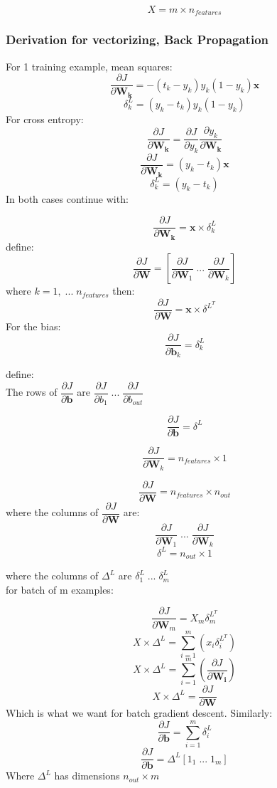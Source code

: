 \documentclass{article}
\begin{document}
$$X = m \times n_{features}$$

\subsubsection*{Derivation for vectorizing, Back Propagation}

For 1 training example, mean squares:
$$\dfrac{\partial{J}}{\partial{\mathbf{W_k}}} = -(t_k - y_k)y_k(1 - y_k)\mathbf{x}$$
$$\delta_k^L = (y_k - t_k)y_k(1 - y_k)$$
For cross entropy:
$$\dfrac{\partial{J}}{\partial{\mathbf{W_k}}} = \dfrac{\partial{J}}{\partial{y_k}} \dfrac{\partial{y_k}}{\partial{\mathbf{W_k}}}$$
$$\dfrac{\partial{J}}{\partial{\mathbf{W_k}}} = (y_k - t_k) \mathbf{x}$$
$$\delta_k^L =  (y_k - t_k)$$
In both cases continue with:

$$\dfrac{\partial{J}}{\partial{\mathbf{W_k}}} = \mathbf{x}\times \delta_k^L$$
define:
$$\dfrac{\partial{J}}{\partial{\mathbf{W}}} = [ \dfrac{\partial{J}}{\partial{\mathbf{W}_1}} \; ... \; \dfrac{\partial{J}}{\partial{\mathbf{W}_k}}]$$
where $k = 1, \; ... \; n_{features}$ then:
$$\dfrac{\partial{J}}{\partial{\mathbf{W}}} = \mathbf{x} \times \delta ^{L^T}$$
For the bias:
$$\dfrac{\partial{J}}{\partial{\mathbf{b}_k}} = \delta _k ^{L}$$

define:\\
The rows of $\dfrac{\partial{J}}{\partial{\mathbf{b}}}$ are $\dfrac{\partial{J}}{\partial{b_1}} \; ... \; \dfrac{\partial{J}}{\partial{b_{out}}}$


$$\dfrac{\partial{J}}{\partial{\mathbf{b}}} = \delta ^L$$

$$\dfrac{\partial{J}}{\partial{\mathbf{W}_k}} = n_{features} \times 1$$

$$\dfrac{\partial{J}}{\partial{\mathbf{W}}} = n_{features} \times n_{out}$$
where the columns of $\dfrac{\partial{J}}{\partial{\mathbf{W}}}$ are:
$$\dfrac{\partial{J}}{\partial{\mathbf{W}_1}} \; ... \; \dfrac{\partial{J}}{\partial{\mathbf{W}_k}}$$
$$\delta^{L} = n_{out} \times 1$$

where the columns of $\Delta ^{L}$ are $\delta_1^{L} \; ... \; \delta_m^{L}$\\
for batch of m examples:

$$\dfrac{\partial{J}}{\partial{\mathbf{W}}_m} = X_m\delta_m^{L^T}$$
$$X\times \Delta ^{L}  = \sum_{i=1}^{m}(x_i \delta_i^{L^T})$$
$$X \times \Delta ^{L}  = \sum_{i=1}^{m}(\dfrac{\partial{J}}{\partial{\mathbf{W_i}}})$$
$$X \times \Delta ^{L}  = \dfrac{\partial{J}}{\partial{\mathbf{W}}}$$
Which is what we want for batch gradient descent. Similarly:
$$\dfrac{\partial{J}}{\partial{\mathbf{b}}} = \sum_{i=1}^{m}\delta_i^{L}$$
$$\dfrac{\partial{J}}{\partial{\mathbf{b}}} = \Delta ^{L}[1_1 \; ... \; 1_m]$$
Where $\Delta^{L}$ has dimensions $n_{out} \times m$
\end{document}
